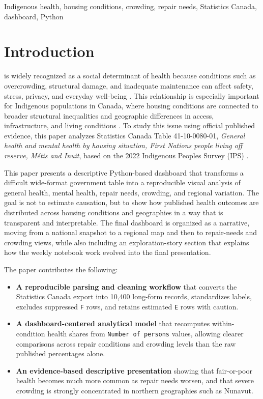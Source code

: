\documentclass[conference]{IEEEtran}
\begin{document}
\begin{IEEEkeywords}
Indigenous health, housing conditions, crowding, repair needs, Statistics Canada, dashboard, Python
\end{IEEEkeywords}

\section{Introduction}

 is widely recognized as a social determinant of health because conditions such as overcrowding, structural damage, and inadequate maintenance can affect safety, stress, privacy, and everyday well-being \cite{who2018}. This relationship is especially important for Indigenous populations in Canada, where housing conditions are connected to broader structural inequalities and geographic differences in access, infrastructure, and living conditions \cite{nccih2017}. To study this issue using official published evidence, this paper analyzes Statistics Canada Table 41-10-0080-01, \emph{General health and mental health by housing situation, First Nations people living off reserve, M\'etis and Inuit}, based on the 2022 Indigenous Peoples Survey (IPS) \cite{statcantable,statcanips}.

This paper presents a descriptive Python-based dashboard that transforms a difficult wide-format government table into a reproducible visual analysis of general health, mental health, repair needs, crowding, and regional variation. The goal is not to estimate causation, but to show how published health outcomes are distributed across housing conditions and geographies in a way that is transparent and interpretable. The final dashboard is organized as a narrative, moving from a national snapshot to a regional map and then to repair-needs and crowding views, while also including an exploration-story section that explains how the weekly notebook work evolved into the final presentation.

The paper contributes the following:
\begin{itemize}
\item \textbf{A reproducible parsing and cleaning workflow} that converts the Statistics Canada export into 10,400 long-form records, standardizes labels, excludes suppressed \texttt{F} rows, and retains estimated \texttt{E} rows with caution.
\item \textbf{A dashboard-centered analytical model} that recomputes within-condition health shares from \texttt{Number of persons} values, allowing clearer comparisons across repair conditions and crowding levels than the raw published percentages alone.
\item \textbf{An evidence-based descriptive presentation} showing that fair-or-poor health becomes much more common as repair needs worsen, and that severe crowding is strongly concentrated in northern geographies such as Nunavut.
\end{itemize}
\end{document}
